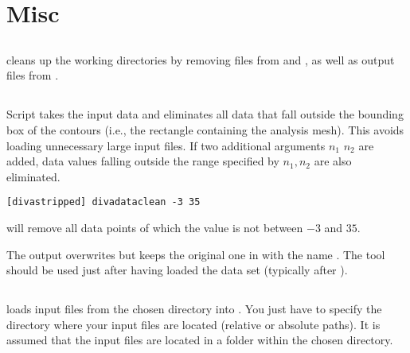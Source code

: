 \section{Misc}

\subsection{}

 cleans up the working directories by removing  files from  and , as well as output files from .

\subsection{}

Script  takes the input data  and eliminates all data that fall outside the bounding box of the contours (i.e., the rectangle containing the analysis mesh). This avoids loading unnecessary large input files. If two additional arguments $n_{1}$ $n_{2}$ are added, data values falling outside the range specified by $n_{1},n_{2}$ are also eliminated.

\example
\begin{lstlisting}[style=Bash]
[divastripped] divadataclean -3 35
\end{lstlisting}
will remove all data points of which the value is not between $-3$ and $35$.

The output overwrites  but keeps the original one in  with the name . The tool should be used just after having loaded the data set (typically after ).

\subsection{\label{sec:divaload}}

 loads input files from the chosen directory into . You just have to specify the directory where your input files are located (relative or absolute paths). It is assumed that the input files are located in a folder  within the chosen directory.

